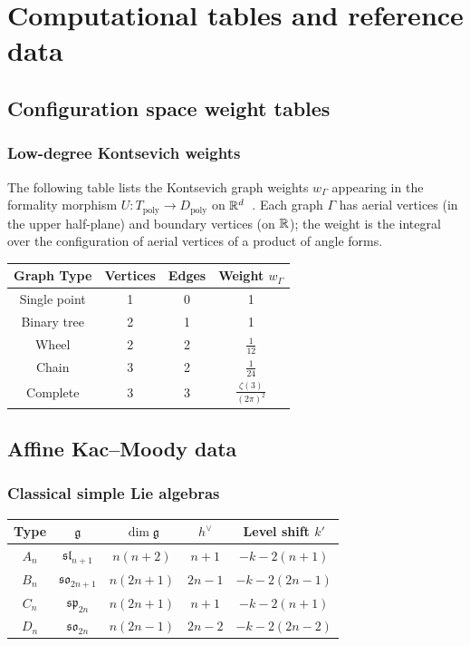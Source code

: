 \chapter[Tables]{Computational tables and reference data}
\label{app:computational-tables}


\section{Configuration space weight tables}

\subsection{Low-degree Kontsevich weights}

The following table lists the Kontsevich graph weights $w_\Gamma$ appearing in the formality morphism $U \colon T_{\mathrm{poly}} \to D_{\mathrm{poly}}$ on $\mathbb{R}^d$~\cite{Kontsevich03}.  Each graph $\Gamma$ has aerial vertices (in the upper half-plane) and boundary vertices (on $\mathbb{R}$); the weight is the integral over the configuration of aerial vertices of a product of angle forms.

\begin{center}
\begin{tabular}{|c|c|c|c|}
\hline
Graph Type & Vertices & Edges & Weight $w_\Gamma$ \\
\hline
Single point & 1 & 0 & 1 \\
\hline
Binary tree & 2 & 1 & 1 \\
\hline
Wheel & 2 & 2 & $\frac{1}{12}$ \\
\hline
Chain & 3 & 2 & $\frac{1}{24}$ \\
\hline
Complete & 3 & 3 & $\frac{\zeta(3)}{(2\pi)^2}$ \\
\hline
\end{tabular}
\end{center}

\section{Affine Kac--Moody data}

\subsection{Classical simple Lie algebras}

\begin{center}
\begin{tabular}{|c|c|c|c|c|}
\hline
Type & $\mathfrak{g}$ & $\dim \mathfrak{g}$ & $h^\vee$ & Level shift $k'$ \\
\hline
$A_n$ & $\mathfrak{sl}_{n+1}$ & $n(n+2)$ & $n+1$ & $-k - 2(n+1)$ \\
\hline
$B_n$ & $\mathfrak{so}_{2n+1}$ & $n(2n+1)$ & $2n-1$ & $-k - 2(2n-1)$ \\
\hline
$C_n$ & $\mathfrak{sp}_{2n}$ & $n(2n+1)$ & $n+1$ & $-k - 2(n+1)$ \\
\hline
$D_n$ & $\mathfrak{so}_{2n}$ & $n(2n-1)$ & $2n-2$ & $-k - 2(2n-2)$ \\
\hline
\end{tabular}
\end{center}


